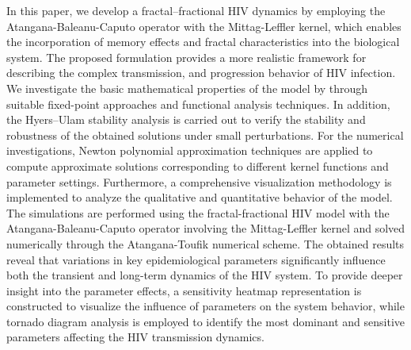 \documentclass{article}
\theoremstyle{plain}
\theoremstyle{definition}
\numberwithin{equation}{section}
\begin{document}



In this paper, we develop a fractal--fractional HIV dynamics by employing the Atangana-Baleanu-Caputo operator with the Mittag-Leffler kernel, which enables the incorporation of memory effects and fractal characteristics into the biological system. The proposed formulation provides a more realistic framework for describing the complex transmission, and progression behavior of HIV infection. We investigate the basic mathematical properties of the model by through suitable fixed-point approaches and functional analysis techniques. In addition, the Hyers--Ulam stability analysis is carried out to verify the stability and robustness of the obtained solutions under small perturbations. For the numerical investigations, Newton polynomial approximation techniques are applied to compute approximate solutions corresponding to different kernel functions and parameter settings. Furthermore, a comprehensive visualization methodology is implemented to analyze the qualitative and quantitative behavior of the model. The simulations are performed using the fractal-fractional HIV model with the Atangana-Baleanu-Caputo operator involving the Mittag-Leffler kernel and solved numerically through the Atangana-Toufik numerical scheme. The obtained results reveal that variations in key epidemiological parameters significantly influence both the transient and long-term dynamics of the HIV system. To provide deeper insight into the parameter effects, a sensitivity heatmap representation is constructed to visualize the influence of parameters on the system behavior, while tornado diagram analysis is employed to identify the most dominant and sensitive parameters affecting the HIV transmission dynamics.

\end{document}
